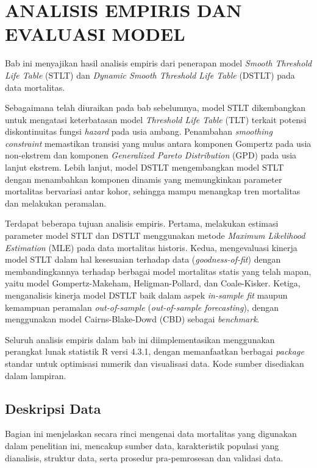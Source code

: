 \chapter{ANALISIS EMPIRIS DAN EVALUASI MODEL}

Bab ini menyajikan hasil analisis empiris dari penerapan model \textit{Smooth Threshold Life Table} (STLT) dan \textit{Dynamic Smooth Threshold Life Table} (DSTLT) pada data mortalitas.

Sebagaimana telah diuraikan pada bab sebelumnya, model STLT dikembangkan untuk mengatasi keterbatasan model \textit{Threshold Life Table} (TLT) terkait potensi diskontinuitas fungsi \textit{hazard} pada usia ambang. Penambahan \textit{smoothing constraint} memastikan transisi yang mulus antara komponen Gompertz pada usia non-ekstrem dan komponen \textit{Generalized Pareto Distribution} (GPD) pada usia lanjut ekstrem. Lebih lanjut, model DSTLT mengembangkan model STLT dengan menambahkan komponen dinamis yang memungkinkan parameter mortalitas bervariasi antar kohor, sehingga mampu menangkap tren mortalitas dan melakukan peramalan.

Terdapat beberapa tujuan analisis empiris. Pertama, melakukan estimasi parameter model STLT dan DSTLT menggunakan metode \textit{Maximum Likelihood Estimation} (MLE) pada data mortalitas historis. Kedua, mengevaluasi kinerja model STLT dalam hal kesesuaian terhadap data (\textit{goodness-of-fit}) dengan membandingkannya terhadap berbagai model mortalitas statis yang telah mapan, yaitu model Gompertz-Makeham, Heligman-Pollard, dan Coale-Kisker. Ketiga, menganalisis kinerja model DSTLT baik dalam aspek \textit{in-sample fit} maupun kemampuan peramalan \textit{out-of-sample} (\textit{out-of-sample forecasting}), dengan menggunakan model Cairns-Blake-Dowd (CBD) sebagai \textit{benchmark}.

Seluruh analisis empiris dalam bab ini diimplementasikan menggunakan perangkat lunak statistik R versi 4.3.1, dengan memanfaatkan berbagai \textit{package} standar untuk optimisasi numerik dan visualisasi data. Kode sumber disediakan dalam lampiran.

\section{Deskripsi Data}

Bagian ini menjelaskan secara rinci mengenai data mortalitas yang digunakan dalam penelitian ini, mencakup sumber data, karakteristik populasi yang dianalisis, struktur data, serta prosedur pra-pemrosesan dan validasi data.

